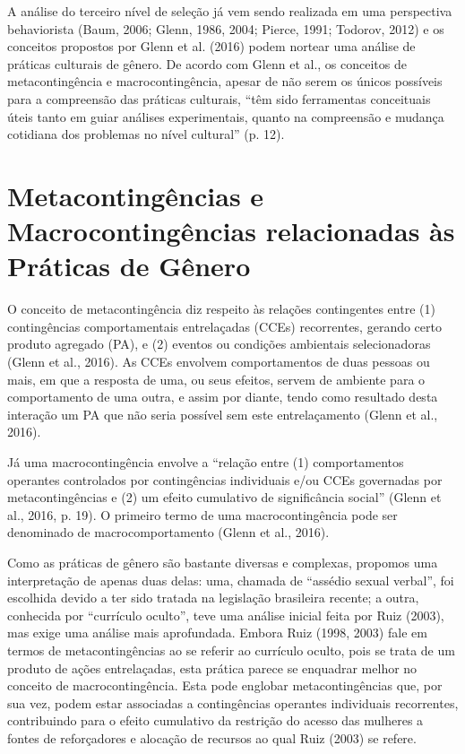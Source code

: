 A análise do terceiro nível de seleção já vem sendo realizada em uma perspectiva behaviorista (Baum, 2006; Glenn, 1986, 2004; Pierce, 1991; Todorov, 2012) e os conceitos propostos por Glenn et al. (2016) podem nortear uma análise de práticas culturais de gênero. De acordo com Glenn et al., os conceitos de metacontingência e macrocontingência, apesar de não serem os únicos possíveis para a compreensão das práticas culturais, “têm sido ferramentas conceituais úteis tanto em guiar análises experimentais, quanto na compreensão e mudança cotidiana dos problemas no nível cultural” (p. 12).

\section{Metacontingências e Macrocontingências relacionadas às Práticas de Gênero}

O conceito de metacontingência diz respeito às relações contingentes entre (1) contingências comportamentais entrelaçadas (CCEs) recorrentes, gerando certo produto agregado (PA), e (2) eventos ou condições ambientais selecionadoras (Glenn et al., 2016). As CCEs envolvem comportamentos de duas pessoas ou mais, em que a resposta de uma, ou seus efeitos, servem de ambiente para o comportamento de uma outra, e assim por diante, tendo como resultado desta interação um PA que não seria possível sem este entrelaçamento (Glenn et al., 2016). 

Já uma macrocontingência envolve a “relação entre (1) comportamentos operantes controlados por contingências individuais e/ou CCEs governadas por metacontingências e (2) um efeito cumulativo de significância social” (Glenn et al., 2016, p. 19). O primeiro termo de uma macrocontingência pode ser denominado de macrocomportamento (Glenn et al., 2016). 

Como as práticas de gênero são bastante diversas e complexas, propomos uma interpretação de apenas duas delas: uma, chamada de “assédio sexual verbal”, foi escolhida devido a ter sido tratada na legislação brasileira recente; a outra, conhecida por “currículo oculto”, teve uma análise inicial feita por Ruiz (2003), mas exige uma análise mais aprofundada. Embora Ruiz (1998, 2003) fale em termos de metacontingências ao se referir ao currículo oculto, pois se trata de um produto de ações entrelaçadas, esta prática parece se enquadrar melhor no conceito de macrocontingência. Esta pode englobar metacontingências que, por sua vez, podem estar associadas a contingências operantes individuais recorrentes, contribuindo para o efeito cumulativo da restrição do acesso das mulheres a fontes de reforçadores e alocação de recursos ao qual Ruiz (2003) se refere.

